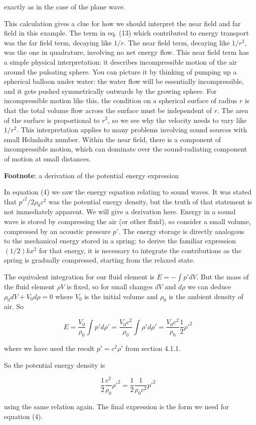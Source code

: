   \noindent{}exactly as in the case of the plane wave. 

  This calculation gives a clue for how we should interpret the near field and 
  far field in this example. The term in eq. (13) which contributed to energy 
  transport was the far field term, decaying like $1/r$. The near field term, 
  decaying like $1/r^2$, was the one in quadrature, involving no net energy 
  flow. This near field term has a simple physical interpretation: it describes 
  incompressible motion of the air around the pulsating sphere. You can picture 
  it by thinking of pumping up a spherical balloon under water: the water flow 
  will be essentially incompressible, and it gets pushed symmetrically outwards 
  by the growing sphere. For incompressible motion like this, the condition on 
  a spherical surface of radius $r$ is that the total volume flow across the 
  surface must be independent of $r$. The area of the surface is proportional 
  to $r^2$, so we see why the velocity needs to vary like $1/r^2$. This 
  interpretation applies to many problems involving sound sources with small 
  Helmholtz number. Within the near field, there is a component of 
  incompressible motion, which can dominate over the sound-radiating component 
  of motion at small distances. 

  \textbf{Footnote}: a derivation of the potential energy expression 

  In equation (4) we saw the energy equation relating to sound waves. It was 
  stated that $p'^2/2\rho_0c^2$ was the potential energy density, but the truth 
  of that statement is not immediately apparent. We will give a derivation 
  here. Energy in a sound wave is stored by compressing the air (or other 
  fluid), so consider a small volume, compressed by an acoustic pressure $p'$. 
  The energy storage is directly analogous to the mechanical energy stored in a 
  spring: to derive the familiar expression $(1/2)kx^2$ for that energy, it is 
  necessary to integrate the contributions as the spring is gradually 
  compressed, starting from the relaxed state. 

  The equivalent integration for our fluid element is $E=-\int{p' dV}$. But the 
  mass of the fluid element $\rho V$ is fixed, so for small changes $dV$ and $d 
  \rho$ we can deduce $\rho_0 dV + V_0 d\rho =0$ where $V_0$ is the initial 
  volume and $\rho_0$ is the ambient density of air. So 

  \begin{equation*}E=\dfrac{V_0}{\rho_0}\int{p' d\rho'}=\dfrac{V_0 
  c^2}{\rho_0}\int{\rho' d\rho'}=\dfrac{V_0 c^2}{\rho_0}\dfrac{1}{2}\rho'^2 
  \tag{15}\end{equation*} 

  \noindent{}where we have used the result $p'=c^2 \rho'$ from section 4.1.1. 

  So the potential energy density is 

  \begin{equation*}\dfrac{1}{2}\dfrac{c^2}{\rho_0}\rho'^2 = 
  \dfrac{1}{2}\dfrac{1}{\rho_0 c^2}p'^2 \tag{16}\end{equation*} 

  \noindent{}using the same relation again. The final expression is the form we 
  need for equation (4). 